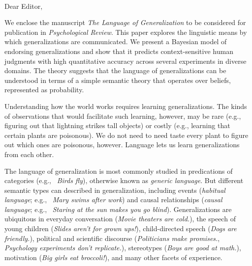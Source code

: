 \documentclass[11pt,letterpaper]{letter} %
\def\opening#1{\thispagestyle{empty}
{\centering\fromaddress \vspace{0.6in} \\ %
\hspace*{\longindentation}\hspace*{\fill}\par} %
\vspace{0.4in} %
\noindent #1 %
}
\begin{document}
\begin{letter}

\opening{Dear Editor,}

We enclose the manuscript \emph{The Language of Generalization} to be considered for publication in \emph{Psychological Review}. 
This paper explores the linguistic means by which generalizations are communicated.  
We present a Bayesian model of endorsing generalizations and show that it predicts context-sensitive human judgments with high quantitative accuracy across several experiments in diverse domains.
The theory suggests that the language of generalizations can be understood in terms of a simple semantic theory that operates over beliefs, represented as probability.

Understanding how the world works requires learning generalizations. 
The kinds of observations that would facilitate such learning, however, may be rare (e.g., figuring out that lightning strikes tall objects) or costly (e.g., learning that certain plants are poisonous).
We do not need to need taste every plant to figure out which ones are poisonous, however.
Language lets us learn generalizations from each other.

The language of generalization is most commonly studied in predications of categories (e.g., ~\emph{Birds fly}), otherwise known as \emph{generic language}.
But different semantic types can described in generalization, including events (\emph{habitual language}; e.g., ~\emph{Mary swims after work}) and causal relationships (\emph{causal language}; e.g., ~\emph{Staring at the sun makes you go blind}).
Generalizations are ubiquitous in everyday conversation (\emph{Movie theaters are cold.}), the speech of young children (\emph{Slides aren't for grown ups!}), child-directed speech (\emph{Dogs are friendly.}), political and scientific discourse (\emph{Politicians make promises.}, \emph{Psychology experiments don't replicate.}), stereotypes (\emph{Boys are good at math.}), motivation (\emph{Big girls eat broccoli!}), and many other facets of experience.



\end{letter}
\end{document}

